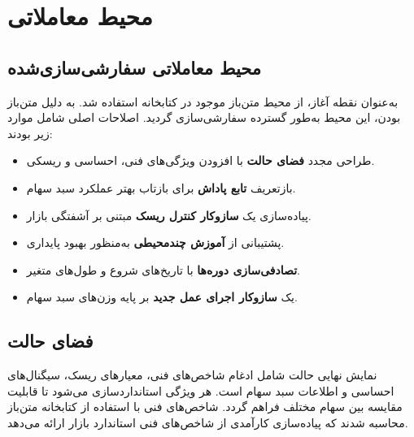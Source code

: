 \documentclass[12pt, a4paper]{report}
\begin{document}
\section{محیط معاملاتی}
\label{sec:rl_env}


\subsection{محیط معاملاتی سفارشی‌سازی‌شده}
به‌عنوان نقطه آغاز، از محیط متن‌باز موجود در کتابخانه  استفاده شد.  
به دلیل متن‌باز بودن، این محیط به‌طور گسترده سفارشی‌سازی گردید.  
اصلاحات اصلی شامل موارد زیر بودند:
\begin{itemize}
    \item طراحی مجدد \textbf{فضای حالت} با افزودن ویژگی‌های فنی، احساسی و ریسکی.  
    \item بازتعریف \textbf{تابع پاداش} برای بازتاب بهتر عملکرد سبد سهام.  
    \item پیاده‌سازی یک \textbf{سازوکار کنترل ریسک} مبتنی بر آشفتگی بازار.  
    \item پشتیبانی از \textbf{آموزش چندمحیطی} به‌منظور بهبود پایداری.  
    \item \textbf{تصادفی‌سازی دوره‌ها} با تاریخ‌های شروع و طول‌های متغیر.  
    \item یک \textbf{سازوکار اجرای عمل جدید} بر پایه وزن‌های سبد سهام.  
\end{itemize}

\subsection{فضای حالت}
نمایش نهایی حالت شامل ادغام شاخص‌های فنی، معیارهای ریسک، سیگنال‌های احساسی و اطلاعات سبد سهام است.  
هر ویژگی استانداردسازی می‌شود تا قابلیت مقایسه بین سهام مختلف فراهم گردد.  
شاخص‌های فنی با استفاده از کتابخانه متن‌باز  محاسبه شدند 
که پیاده‌سازی کارآمدی از شاخص‌های فنی استاندارد بازار ارائه می‌دهد.  
\end{document}
